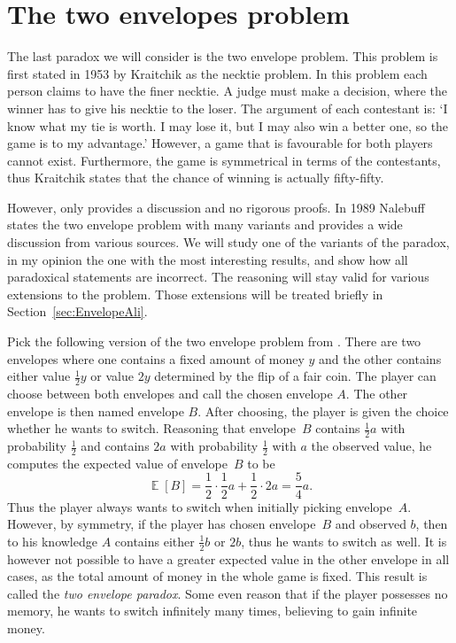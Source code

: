 \documentclass[a4paper]{report}
\theoremstyle{plain}
\theoremstyle{definition}
\theoremstyle{remark}
\numberwithin{equation}{chapter}
\DeclareMathOperator{\E}{\mathbb{E}}
\DeclareMathOperator{\1}{\mathbbm{1}}
\begin{document}
\chapter{The two envelopes problem}\label{chap:TwoEnvelope}
The last paradox we will consider is the two envelope problem. This problem is first stated in 1953 by Kraitchik \cite{Kraitchik53} as the necktie problem. In this problem each person claims to have the finer necktie. A judge must make a decision, where the winner has to give his necktie to the loser. The argument of each contestant is: `I know what my tie is worth. I may lose it, but I may also win a better one, so the game is to my advantage.' However, a game that is favourable for both players cannot exist. Furthermore, the game is symmetrical in terms of the contestants, thus Kraitchik states that the chance of winning is actually fifty-fifty.

However, \cite{Kraitchik53} only provides a discussion and no rigorous proofs. In 1989 Nalebuff \cite{Nalebuff89} states the two envelope problem with many variants and provides a wide discussion from various sources. We will study one of the variants of the paradox, in my opinion the one with the most interesting results, and show how all paradoxical statements are incorrect. The reasoning will stay valid for various extensions to the problem. Those extensions will be treated briefly in Section~\ref{sec:EnvelopeAli}.

Pick the following version of the two envelope problem from \cite{Nalebuff89}. There are two envelopes where one contains a fixed amount of money $y$ and the other contains either value $\frac{1}{2}y$ or value $2y$ determined by the flip of a fair coin. The player can choose between both envelopes and call the chosen envelope $A$. The other envelope is then named envelope $B$. After choosing, the player is given the choice whether he wants to switch. Reasoning that envelope~$B$ contains $\frac{1}{2}a$ with probability $\frac{1}{2}$ and contains $2a$ with probability $\frac{1}{2}$ with $a$ the observed value, he computes the expected value of envelope~$B$ to be
\begin{equation}\label{eq:EnvelopeIntroWrong}
\E[B]=\frac{1}{2}\cdot\frac{1}{2}a+\frac{1}{2}\cdot2a=\frac{5}{4}a.
\end{equation}
Thus the player always wants to switch when initially picking envelope~$A$. However, by symmetry, if the player has chosen envelope~$B$ and observed $b$, then to his knowledge $A$ contains either $\frac{1}{2}b$ or $2b$, thus he wants to switch as well. It is however not possible to have a greater expected value in the other envelope in all cases, as the total amount of money in the whole game is fixed. This result is called the \emph{two envelope paradox}. Some even reason that if the player possesses no memory, he wants to switch infinitely many times, believing to gain infinite money.
\end{document}
